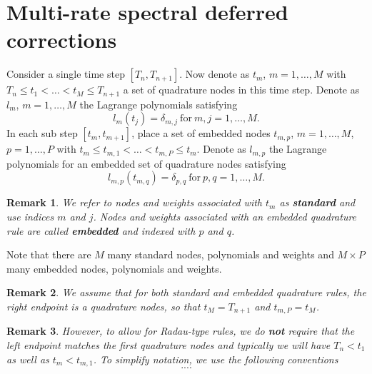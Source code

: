 \documentclass{article}
\newtheorem{remark}{Remark}
\begin{document}
\section*{Multi-rate spectral deferred corrections}
Consider a single time step $[T_{n}, T_{n+1}]$.
Now denote as $t_m$, $m=1, \ldots, M$ with $T_{n} \leq t_1 < \ldots < t_{M} \leq T_{n+1}$ a set of quadrature nodes in this time step.
Denote as $l_m$, $m=1, \ldots, M$ the Lagrange polynomials satisfying 
\begin{equation}
	l_m(t_j) = \delta_{m,j} \ \text{for} \ m,j=1, \ldots, M.
\end{equation}
In each sub step $[t_m, t_{m+1}]$, place a set of embedded nodes $t_{m,p}$, $m=1,\ldots,M$, $p=1,\ldots,P$ with $t_{m} \leq t_{m,1} < \ldots < t_{m,P} \leq t_{m}$.
Denote as $l_{m,p}$ the Lagrange polynomials for an embedded set of quadrature nodes satisfying
\begin{equation}
	l_{m,p}(t_{m,q}) = \delta_{p,q} \ \text{for} \ p,q=1,\ldots,M.
\end{equation}
\begin{remark}
We refer to nodes and weights associated with $t_m$ as \textbf{standard} and use indices $m$ and $j$.
Nodes and weights associated with an embedded quadrature rule are called \textbf{embedded} and indexed with $p$ and $q$.
\end{remark}
Note that there are $M$ many standard nodes, polynomials and weights and $M \times P$ many embedded nodes, polynomials and weights.
\begin{remark}
We assume that for both standard and embedded quadrature rules, the right endpoint is a quadrature nodes, so that $t_{M} = T_{n+1}$ and $t_{m,P} = t_{M}$.
\end{remark}
\begin{remark}
However, to allow for Radau-type rules, we do \textbf{not} require that the left endpoint matches the first quadrature nodes and typically we will have $T_n < t_1$ as well as $t_{m} < t_{m,1}$.
To simplify notation, we use the following conventions
\begin{equation}
	....
\end{equation}
\end{remark}
\end{document}
